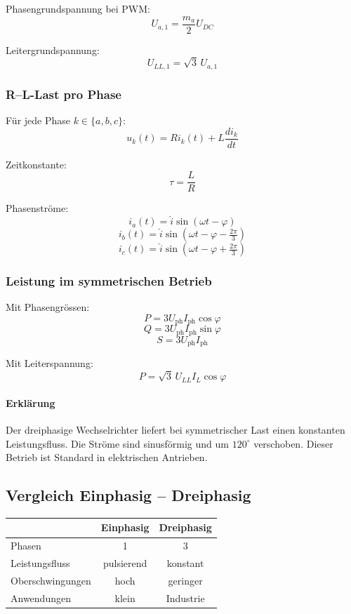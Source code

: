 Phasengrundspannung bei PWM:
\[
\boxed{U_{a,1} = \frac{m_a}{2} U_{DC}}
\]

Leitergrundspannung:
\[
\boxed{U_{LL,1} = \sqrt{3}\, U_{a,1}}
\]

\subsubsection{R--L-Last pro Phase}

Für jede Phase $k \in \{a,b,c\}$:
\[
\boxed{u_k(t) = R i_k(t) + L \frac{di_k}{dt}}
\]

Zeitkonstante:
\[
\boxed{\tau = \frac{L}{R}}
\]

Phasenströme:
\[
i_a(t) = \hat i \sin(\omega t - \varphi)
\]
\[
i_b(t) = \hat i \sin(\omega t - \varphi - \tfrac{2\pi}{3})
\]
\[
i_c(t) = \hat i \sin(\omega t - \varphi + \tfrac{2\pi}{3})
\]

\subsubsection{Leistung im symmetrischen Betrieb}

Mit Phasengrössen:
\[
\boxed{P = 3 U_{\mathrm{ph}} I_{\mathrm{ph}} \cos\varphi}
\]
\[
\boxed{Q = 3 U_{\mathrm{ph}} I_{\mathrm{ph}} \sin\varphi}
\]
\[
\boxed{S = 3 U_{\mathrm{ph}} I_{\mathrm{ph}}}
\]

Mit Leiterspannung:
\[
\boxed{P = \sqrt{3}\, U_{LL} I_L \cos\varphi}
\]

\paragraph{Erklärung}

Der dreiphasige Wechselrichter liefert bei symmetrischer Last einen konstanten Leistungsfluss.
Die Ströme sind sinusförmig und um $120^\circ$ verschoben.
Dieser Betrieb ist Standard in elektrischen Antrieben.

\subsection{Vergleich Einphasig -- Dreiphasig}

\begin{center}
\begin{tabular}{l|c|c}
 & Einphasig & Dreiphasig \\ \hline
Phasen & 1 & 3 \\
Leistungsfluss & pulsierend & konstant \\
Oberschwingungen & hoch & geringer \\
Anwendungen & klein & Industrie \\
\end{tabular}
\end{center}

